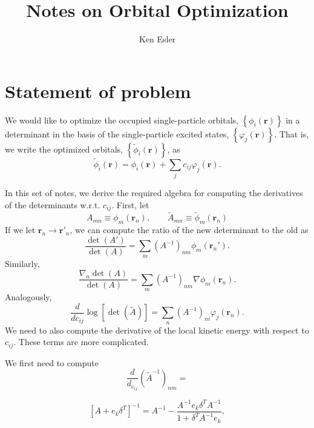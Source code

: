 \documentclass[letterpaper]{article}
\title{Notes on Orbital Optimization}
\author{Ken Esler}
\begin{document}
\maketitle
\newcommand{\vr}{\mathbf{r}}
\newcommand{\Aopt}{\tilde{A}}
\section{Statement of problem}
We would like to optimize the occupied single-particle orbitals,
$\left\{\phi_i(\vr)\right\}$ in a determinant in the basis of the
single-particle excited states, $\left\{\varphi_j(\vr)\right\}$.
That is, we write the optimized orbitals,
$\left\{\tilde{\phi}_i(\vr)\right\}$, as
\begin{equation}
\tilde{\phi}_i(\vr) = \phi_i(\vr) + \sum_j c_{ij} \varphi_j(\vr).
\end{equation}

In this set of notes, we derive the required algebra for computing the
derivatives of the determinants w.r.t. $c_{ij}$.  First, let
\begin{equation}
A_{mn} \equiv \phi_m(\vr_n),\qquad \Aopt_{mn} \equiv \tilde{\phi}_m(\vr_n)
\end{equation}
If we let $\vr_n \rightarrow \vr'_n$, we can compute the ratio of the
new determinant to the old as
\begin{equation}
\frac{\det(A')}{\det(A)} = \sum_m \left(A^{-1}\right)_{nm} \phi_m(\vr_n').
\end{equation}
Similarly,
\begin{equation}
\frac{\nabla_n\det(A)}{\det(A)} = \sum_m \left(A^{-1}\right)_{nm} \nabla\phi_m(\vr_n).
\end{equation}
Analogously, 
\begin{equation}
\frac{d}{d c_{ij}} \log\left[\det(\Aopt)\right] = \sum_n
\left(A^{-1}\right)_{ni} \varphi_j(\vr_n).
\end{equation}
We need to also compute the derivative of the local kinetic energy
with respect to $c_{ij}$.  These terms are more complicated.  


We first need to compute
\begin{equation}
\frac{d}{d_{c_{ij}}} \left(\Aopt^{-1}\right)_{nm} = 
\end{equation}

\begin{equation}
\left[A + e_k\delta^T\right]^{-1} = A^{-1} - \frac{A^{-1}e_k\delta^T
  A^{-1}}{1 + \delta^T A^{-1}e_k},
\end{equation}
\end{document}
